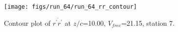 \begin{figure}[H]
\centering
\texttt{[image: figs/run\_64/run\_64\_rr\_contour]}
\caption{Contour plot of $\overline{r^\prime r^\prime}$ at $z/c$=10.00, $V_{free}$=21.15, station 7.}
\label{fig:run_64_rr_contour}
\end{figure}



